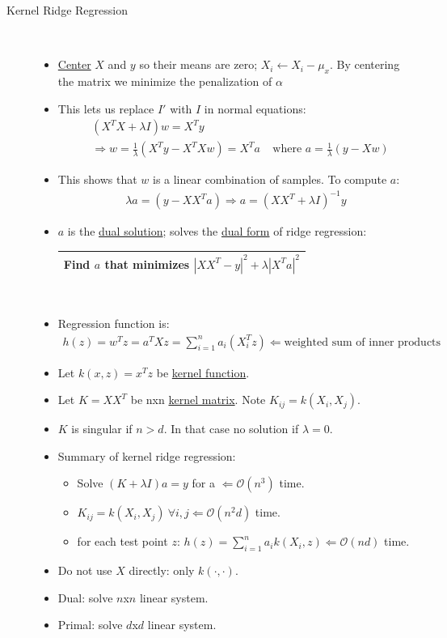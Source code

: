 \documentclass[10pt]{article}
\begin{document}
\begin{description}
	\item[Kernel Ridge Regression]
	\
	\begin{itemize}
		\item \underline{Center} $X$ and $y$ so their means are zero; $X_{i} \leftarrow X_{i} - \mu_{x}$. By centering the matrix we minimize the penalization of $\alpha$
		\item This lets us replace $I'$ with $I$ in normal equations:
			\begin{align*}
				&(X^{T}X + \lambda I)w = X^{T}y\\
				&\Rightarrow w = \frac{1}{\lambda}(X^{T}y - X^{T}Xw) = X^{T}a  \ \ \ \ \ \text{where } a = \frac{1}{\lambda}(y-Xw)
			\end{align*}
		\item This shows that $w$ is a linear combination of samples. To compute $a$:
			\begin{align*}
				\lambda a = (y - XX^{T}a) \Rightarrow a = (XX^{T} + \lambda I)^{-1}y
			\end{align*}
		\item $a$ is the \underline{dual solution}; solves the \underline{dual form} of ridge regression:
		\begin{center}
			\begin{tabular}{|c|}
				\hline
				Find $a$ that minimizes $|XX^{T} - y|^{2} + \lambda|X^{T}a|^{2}$\\
				\hline
			\end{tabular}\\
		\end{center}
		\item Regression function is:
			\begin{align*}
				h(z) = w^{T}z = a^{T}Xz = \sum_{i=1}^{n} a_{i}(X_{i}^{T}z) \Leftarrow \text{weighted sum of inner products}
			\end{align*}
		\item Let $k(x, z) = x^{T}z$ be \underline{kernel function}.
		\item Let $K = XX^{T}$ be nxn \underline{kernel matrix}. Note $K_{ij} = k(X_{i}, X_{j})$.
		\item $K$ is singular if $n>d$. In that case no solution if $\lambda = 0$.
		\item Summary of kernel ridge regression:
			\begin{itemize}
				\item Solve $(K + \lambda I)a = y$  for a $\Leftarrow \mathcal{O}(n^{3})$ time.
				\item $K_{ij} = k(X_{i}, X_{j}) \ \forall i,j \Leftarrow \mathcal{O}(n^{2}d)$ time.
				\item for each test point $z$: $h(z) = \sum_{i=1}^{n} a_{i} k(X_{i}, z) \Leftarrow \mathcal{O}(nd)$ time.
			\end{itemize}
		\item Do not use $X$ directly: only $k(\cdot , \cdot)$.
		\item Dual: solve $n$x$n$ linear system.
		\item Primal: solve $d$x$d$ linear system.
	\end{itemize}
	

\end{description}
\end{document}
